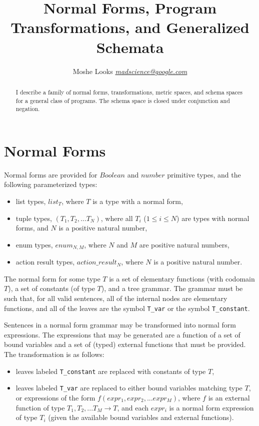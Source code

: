 \documentclass[letterpaper]{article}
\begin{document}
\sloppy
\title
{Normal Forms, Program Transformations, and Generalized Schemata}
\author{
  Moshe Looks
  \href{mailto:moshe@metacog.org}{\emph{madscience@google.com}}
}
\maketitle

\begin{abstract}
  I describe a family of normal forms, transformations, metric spaces, and
  schema spaces for a general class of programs. The schema space is closed
  under conjunction and negation.
\end{abstract}

\section{Normal Forms}

Normal forms are provided for $Boolean$ and $number$ primitive types, and the
following parameterized types:
\begin{itemize}
\item list types, $list_T$, where $T$ is a type with a normal form,
\item tuple types, $(T_1,T_2, ... T_N)$, where all $T_i$ ($1 \leq i \leq N$)
  are types with normal forms, and $N$ is a positive natural number,
\item enum types, $enum_{N,M}$, where $N$ and $M$ are positive natural
  numbers,
\item action result types, $action\_result_N$, where $N$ is a positive natural
  number.
\end{itemize}

The normal form for some type $T$ is a set of elementary functions (with
codomain $T$), a set of constants (of type $T$), and a tree grammar. The
grammar must be such that, for all valid sentences, all of the internal nodes
are elementary functions, and all of the leaves are the symbol \verb|T_var| or
the symbol \verb|T_constant|.

Sentences in a normal form grammar may be transformed into normal form
expressions. The expressions that may be generated are a function of a set of
bound variables and a set of (typed) external functions that must be
provided. The transformation is as follows:
\begin{itemize}
\item leaves labeled \verb|T_constant| are replaced with constants of type $T$,
\item leaves labeled \verb|T_var| are replaced to either bound variables
  matching type $T$, or expressions of the form $f(expr_1, expr_2,
  ... expr_M)$, where $f$ is an external function of type $T_1, T_2, ... T_M
  \rightarrow T$, and each $expr_i$ is a normal form expression of type $T_i$
  (given the available bound variables and external functions).
\end{itemize}
\end{document}
